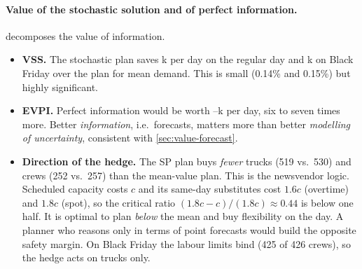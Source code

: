 \paragraph{Value of the stochastic solution and of perfect information.}
\begin{table}[t]
\centering\small
\caption{Value of the stochastic solution (VSS $=$ EEV $-$ RP, paired over 5000 scenarios, $\pm$ 95\% CI) and expected value of perfect information (EVPI $=$ RP $-$ WS over 100 scenarios). RP: stochastic plan; EEV: plan for the mean demand; WS: wait-and-see.}\label{tab:vss}
\resizebox{\linewidth}{!}{}
\end{table}

 decomposes the value of information.
\begin{itemize}
  \item \textbf{VSS.} The stochastic plan saves k per day on the regular day and k on Black Friday over the plan for mean demand. This is small (0.14\% and 0.15\%) but highly significant.
  \item \textbf{EVPI.} Perfect information would be worth --k per day, six to seven times more. Better \emph{information}, i.e.\ forecasts, matters more than better \emph{modelling of uncertainty}, consistent with \cref{sec:value-forecast}.
  \item \textbf{Direction of the hedge.} The SP plan buys \emph{fewer} trucks (519 vs.\ 530) and crews (252 vs.\ 257) than the mean-value plan. This is the newsvendor logic. Scheduled capacity costs $c$ and its same-day substitutes cost $1.6c$ (overtime) and $1.8c$ (spot), so the critical ratio $(1.8c-c)/(1.8c)\approx0.44$ is below one half. It is optimal to plan \emph{below} the mean and buy flexibility on the day. A planner who reasons only in terms of point forecasts would build the opposite safety margin. On Black Friday the labour limits bind (425 of 426 crews), so the hedge acts on trucks only.
\end{itemize}
